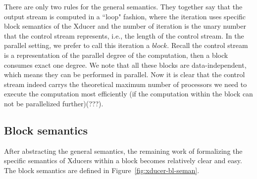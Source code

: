There are only two rules for the general semantics. 
They together say that the output stream is computed in a ``loop" fashion, where the 
iteration uses specific block semantics of the Xducer and the number of iteration is the unary number that the control stream represents, i.e., the length of the control stream. 
In the parallel setting, we prefer to call this iteration a $block$. 
Recall the control stream is a representation of the parallel degree of the computation, then a block consumes exact one degree. 
We note that all these blocks are data-independent, which means they can be performed in parallel. 
Now it is clear that the control stream indeed carrys the theoretical
maximum number of processors we need to execute the computation most efficiently (if the computation within the block can not be parallelized further)(???).



\subsection{Block semantics}
After abstracting the general semantics, the remaining work of formalizing the specific semantics of Xducers within a block becomes relatively clear and easy. The block semantics are defined in Figure~\ref{fig:xducer-bl-seman}. 




